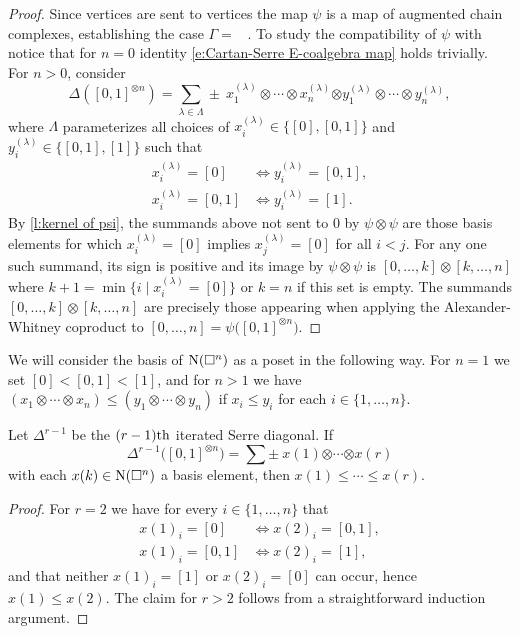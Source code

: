 \begin{proof}
	Since vertices are sent to vertices the map $\psi$ is a map of augmented chain complexes, establishing the case $\Gamma =$ \counit \ .
	To study the compatibility of $\psi$ with \coproduct \, notice that for $n=0$ identity \eqref{e:Cartan-Serre E-coalgebra map} holds trivially.
	For $n > 0$, consider
	\[
	\Delta([0,1]^{\otimes n}) = \sum_{\lambda \in \Lambda} \pm \ x_1^{(\lambda)} \otimes \cdots \otimes x_n^{(\lambda)} \bm{\otimes} y_1^{(\lambda)} \otimes \cdots \otimes y_n^{(\lambda)},
	\]
	where $\Lambda$ parameterizes all choices of $x_i^{(\lambda)} \in \{[0], [0,1]\}$ and $y_i^{(\lambda)} \in \{[0,1], [1]\}$ such that
	\begin{align*}
	x_i^{(\lambda)} = [0]   & \iff y_i^{(\lambda)} = [0,1], \\
	x_i^{(\lambda)} = [0,1] & \iff y_i^{(\lambda)} = [1].
	\end{align*}
	By \cref{l:kernel of psi}, the summands above not sent to $0$ by $\psi \otimes \psi$ are those basis elements for which $x_i^{(\lambda)} = [0]$ implies $x_j^{(\lambda)} = [0]$ for all $i < j$.
	For any one such summand, its sign is positive and its image by $\psi \otimes \psi$ is $[0, \dots, k] \otimes [k, \dots, n]$ where $k+1 = \min \{i \mid x_i^{(\lambda)} = [0]\}$ or $k = n$ if this set is empty.
	The summands $[0, \dots, k] \otimes [k, \dots, n]$ are precisely those appearing when applying the Alexander-Whitney coproduct to $[0, \dots, n] = \psi \big( [0,1]^{\otimes n} \big)$.
\end{proof}

We will consider the basis of $\operatorname{N}(\square^n)$ as a poset in the following way.
For $n = 1$ we set $[0] < [0,1] < [1]$, and for $n > 1$ we have $(x_1 \otimes \cdots \otimes x_n) \leq (y_1 \otimes \cdots \otimes y_n)$ if $x_i \leq y_i$ for each $i \in \{1, \dots, n\}$. 

\begin{lemma}
	Let $\Delta^{r-1}$ be the $(r-1)\mathrm{th}$ iterated Serre diagonal.
	If
	\[	
	\Delta^{r-1} \big([0,1]^{\otimes n}\big) =
	\sum \pm \ x{(1)} \bm{\otimes} \cdots \bm{\otimes} x{(r)}
	\]
	with each $x(k) \in \operatorname{N}(\square^n)$ a basis element, then $x{(1)} \leq \cdots \leq x{(r)}$.
\end{lemma}

\begin{proof}
	For $r = 2$ we have for every $i \in \{1, \dots, n\}$ that
	\begin{align*}
	x(1)_i = [0]   & \iff x(2)_i = [0,1], \\
	x(1)_i = [0,1] & \iff x(2)_i = [1],
	\end{align*}
	and that neither $x(1)_i = [1]$ or $x(2)_i = [0]$ can occur, hence $x(1) \leq x(2)$.
	The claim for $r > 2$ follows from a straightforward induction argument.
\end{proof}

